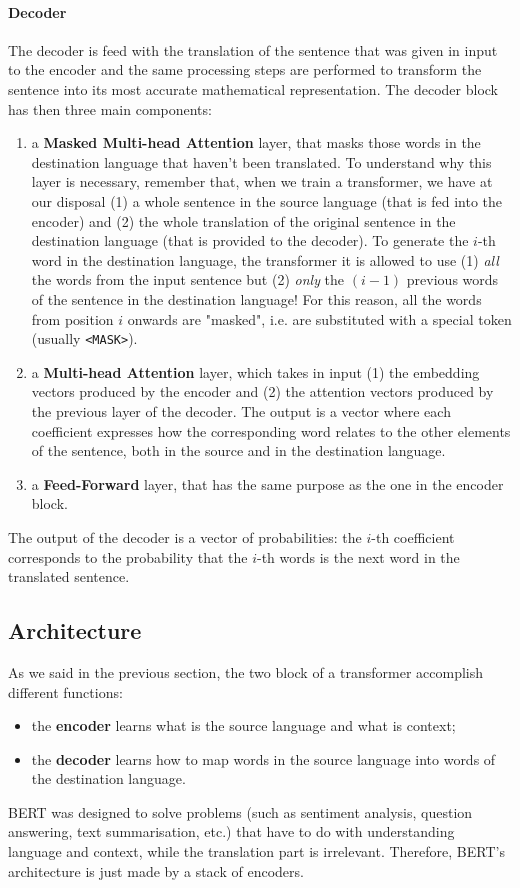 \documentclass[12pt,a4paper]{book}
\theoremstyle{definition}
\begin{document}
	\paragraph{Decoder}
	The decoder is feed with the translation of the sentence that was given in input to the encoder and the same processing steps are performed to transform the sentence into its most accurate mathematical representation. The decoder block has then three main components:
	\begin{enumerate}
		\item a \textbf{Masked Multi-head Attention} layer, that masks those words in the destination language that haven't been translated. To understand why this layer is necessary, remember that, when we train a transformer, we have at our disposal (1) a whole sentence in the source language (that is fed into the encoder) and (2) the whole translation of the original sentence in the destination language (that is provided to the decoder). To generate the $i$-th word in the destination language, the transformer it is allowed to use (1) \textit{all} the words from the input sentence but (2) \textit{only} the $(i-1)$ previous words of the sentence in the destination language! For this reason, all the words from position $i$ onwards are "masked", i.e. are substituted with a special token (usually \texttt{<MASK>}).
		\item a \textbf{Multi-head Attention} layer, which takes in input (1) the embedding vectors produced by the encoder and (2) the attention vectors produced by the previous layer of the decoder. The output is a vector where each coefficient expresses how the corresponding word relates to the other elements of the sentence, both in the source and in the destination language.
		\item a \textbf{Feed-Forward} layer, that has the same purpose as the one in the encoder block.
	\end{enumerate}
	The output of the decoder is a vector of probabilities: the $i$-th coefficient corresponds to the probability that the $i$-th words is the next word in the translated sentence.
	\subsection{Architecture}
	As we said in the previous section, the two block of a transformer accomplish different functions:
	\begin{itemize}
		\item the \textbf{encoder} learns what is the source language and what is context;
		\item the \textbf{decoder} learns how to map words in the source language into words of the destination language.
	\end{itemize}
	BERT was designed to solve problems (such as sentiment analysis, question answering, text summarisation, etc.) that have to do with understanding language and context, while the translation part is irrelevant. Therefore, BERT's architecture is just made by a stack of encoders.
\end{document}
